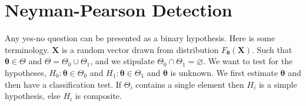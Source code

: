 \documentclass[a4paper]{article}
\begin{document}
\section*{Neyman-Pearson Detection}%
Any yes-no question can be presented as a binary hypothesis. Here is some terminology. $\bm{X}$ is a random vector drawn from distribution $F_{\bm{\theta}}(\bm{X})$. Such that $\bm{\theta} \in \Theta$ and $\Theta = \Theta_0 \cup \Theta_1$, and we stipulate $\Theta_0 \cap \Theta_1 = \varnothing$. We want to test for the hypotheses, $H_0: \bm{\theta} \in \Theta_0$ and $H_1: \bm{\theta} \in \Theta_1$ and $\bm{\theta}$ is unknown. We first estimate $\bm{\theta}$ and then have a classification test. If $\Theta_i$ contains a single element then $H_i$ is a simple hypothesis, else $H_i$ is composite.
\end{document}
